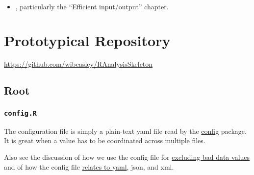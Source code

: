 \documentclass[
]{book}
\providecommand{\tightlist}{%
  \setlength{\itemsep}{0pt}\setlength{\parskip}{0pt}}
\begin{document}
\begin{itemize}
\tightlist
\item
  \citep{gillespie}, particularly the ``Efficient input/output'' chapter.
\end{itemize}

\hypertarget{repo-prototype}{%
\chapter{Prototypical Repository}\label{repo-prototype}}

\url{https://github.com/wibeasley/RAnalysisSkeleton}

\hypertarget{repo-root}{%
\section{Root}\label{repo-root}}

\hypertarget{repo-config}{%
\subsection{\texorpdfstring{\texttt{config.R}}{config.R}}\label{repo-config}}

The configuration file is simply a plain-text yaml file read by the \href{https://CRAN.R-project.org/package=config}{config} package. It is great when a value has to be coordinated across multiple files.

Also see the discussion of how we use the config file for \href{https://ouhscbbmc.github.io/data-science-practices-1/coding.html\#excluding-bad-cases}{excluding bad data values} and of how the config file \protect\hyperlink{data-containers-yaml}{relates to yaml}, json, and xml.
\end{document}
